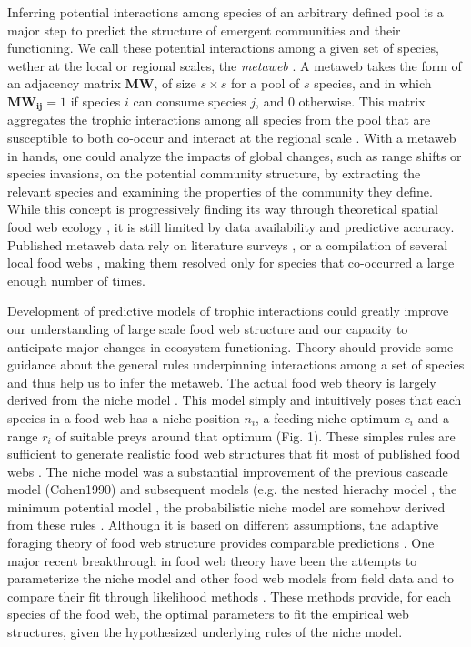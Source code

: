 \documentclass[12pt]{article}
\begin{document}
Inferring potential interactions among species of an arbitrary defined pool is a
major step to predict the structure of emergent communities and their
functioning. We call these potential interactions among a given set of species, wether
at the local or regional scales, the \emph{metaweb} \parencite{Dunne2006}. A
metaweb takes the form of an adjacency matrix $\mathbf{MW}$, of size $s\times s$
for a pool of $s$ species, and in which $\mathbf{MW_{ij}} = 1$ if species $i$
can consume species $j$, and $0$ otherwise. This matrix aggregates the trophic
interactions among all species from the pool that are susceptible to both
co-occur and interact at the regional scale \parencite{Dunne2006}. With a
metaweb in hands, one could analyze the impacts of global changes, such as range
shifts or species invasions, on the potential community structure, by extracting
the relevant species and examining the properties of the community they define.
While this concept is progressively finding its way through theoretical spatial
food web ecology \parencite{Lafferty2010, Pillai2009, Gravel2011a, Gravel2011b},
it is still limited by data availability and predictive accuracy. Published
metaweb data rely on literature surveys \parencite{Havens1992, Piechnik2008,
Baiser2012}, or a compilation of several local food webs \parencite{Stanko2002,
Poisot2012a}, making them resolved only for species that co-occurred a large
enough number of times.

Development of predictive models of trophic interactions could greatly improve
our understanding of large scale food web structure and our capacity to
anticipate major changes in ecosystem functioning. Theory should provide some
guidance about the general rules underpinning interactions among a set of
species and thus help us to infer the metaweb. The actual food web theory is
largely derived from the niche model \parencite{Williams2000}. This model simply
and intuitively poses that each species in a food web has a niche position
$n_i$, a feeding niche optimum $c_i$ and a range $r_i$ of suitable preys around
that optimum (Fig. 1). These simples rules are sufficient to generate realistic
food web structures that fit most of published food webs \parencite{Dunne2006}.
The niche model was a substantial improvement of the previous cascade model
(Cohen1990) and subsequent models (e.g. the nested hierachy model
\parencite{Cattin2004}, the minimum potential model \parencite{Allesina2008},
the probabilistic niche model \parencite{Williams2010} are somehow derived from
these rules \parencite{Stouffer2005}. Although it is based on different
assumptions, the adaptive foraging theory of food web structure
\parencite{Petchey2008b} provides comparable predictions
\parencite{Williams2010}. One major recent breakthrough in food web theory have
been the attempts to parameterize the niche model and other food web models from
field data and to compare their fit through likelihood methods
\parencite{Allesina2008, Williams2010, Williams2011}. These methods provide, for
each species of the food web, the optimal parameters to fit the empirical web
structures, given the hypothesized underlying rules of the niche model.
\end{document}
